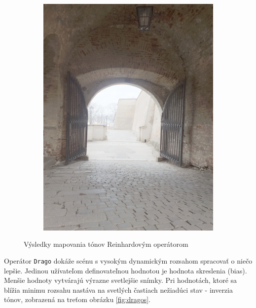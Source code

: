 \begin{figure}[h!]
\begin{subfigure}{0.3\textwidth}
    \includegraphics[width=\textwidth]{figures/tests/tmo/rein4}
  \end{subfigure}
  \caption{Výsledky mapovania tónov Reinhardovým operátorom}
  \label{fig:reinhards}
\end{figure}

Operátor \texttt{Drago} dokáže scénu s vysokým dynamickým rozsahom spracovať o niečo lepšie.
Jedinou užívateľom definovateľnou hodnotou je hodnota skreslenia (bias). Menšie hodnoty vytvárajú výrazne svetlejšie
snímky. Pri hodnotách, ktoré sa blížia minimu rozsahu nastáva na svetlých častiach nežiadúci stav - inverzia tónov,
zobrazená na treťom obrázku \ref{fig:dragos}.

